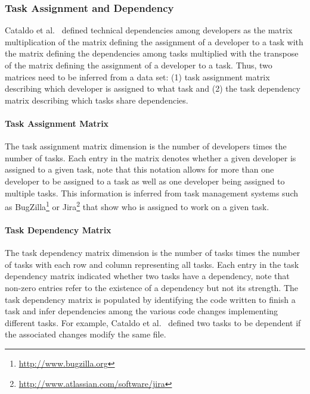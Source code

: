 \subsubsection{Task Assignment and Dependency}
Cataldo et al.~\cite{cataldo:cscw:2006} defined  technical dependencies among developers as the matrix multiplication of the matrix defining the assignment of a developer to a task with the matrix defining the dependencies among tasks multiplied with the transpose of the matrix defining the assignment of a developer to a task.
Thus, two matrices need to be inferred from a data set: (1) task assignment matrix describing which developer is assigned to what task and (2) the task dependency matrix describing which tasks share dependencies.

\paragraph{Task Assignment Matrix}
The task assignment matrix dimension is the number of developers times the number of tasks.
Each entry in the matrix denotes whether a given developer is assigned to a given task, note that this notation allows for more than one developer to be assigned to a task as well as one developer being assigned to multiple tasks.
This information is inferred from task management systems such as BugZilla\footnote{\url{http://www.bugzilla.org}} or Jira\footnote{\url{http://www.atlassian.com/software/jira}} that show who is assigned to work on a given task.

\paragraph{Task Dependency Matrix}
The task dependency matrix dimension is the number of tasks times the number of tasks with each row and column representing all tasks.
Each entry in the task dependency matrix indicated whether two tasks have a dependency, note that non-zero entries refer to the existence of a dependency but not its strength.
The task dependency matrix is populated by identifying the code written to finish a task and infer dependencies among the various code changes implementing different tasks.
For example, Cataldo et al.~\cite{cataldo:cscw:2006} defined two tasks to be dependent if the associated changes modify the same file. 


